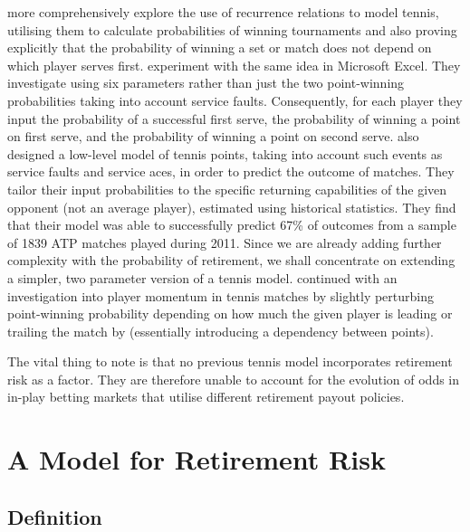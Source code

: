 \documentclass[authoryear, 12pt]{elsarticle}
\begin{document}
\cite{servefirst} more comprehensively explore the use of recurrence relations to model tennis, utilising them to calculate probabilities of winning tournaments and also proving explicitly that the probability of winning a set or match does not depend on which player serves first.  \cite{excel} experiment with the same idea in Microsoft Excel.  They investigate using six parameters rather than just the two point-winning probabilities taking into account service faults.  Consequently, for each player they input the probability of a successful first serve, the probability of winning a point on first serve, and the probability of winning a point on second serve.  \cite{willyk} also designed a low-level model of tennis points, taking into account such events as service faults and service aces, in order to predict the outcome of matches.  They tailor their input probabilities to the specific returning capabilities of the given opponent (not an average player), estimated using historical statistics.  They find that their model was able to successfully predict 67\% of outcomes from a sample of 1839 ATP matches played during 2011.  Since we are already adding further complexity with the probability of retirement, we shall concentrate on extending a simpler, two parameter version of a tennis model.  \cite{momentum} continued with an investigation into player momentum in tennis matches by slightly perturbing point-winning probability depending on how much the given player is leading or trailing the match by (essentially introducing a dependency between points).

The vital thing to note is that no previous tennis model incorporates retirement risk as a factor.  They are therefore unable to account for the evolution of odds in in-play betting markets that utilise different retirement payout policies.

\newpage

\section{A Model for Retirement Risk}

\subsection{Definition}
\end{document}
